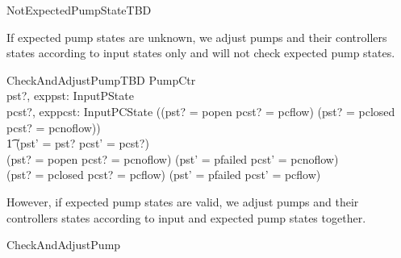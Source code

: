 \documentclass{report} %
\begin{document}
\begin{zed}
NotExpectedPumpStateTBD 
\end{zed}
If expected pump states are unknown, we adjust pumps and their controllers states according to input states only and will not check expected pump states.

\begin{schema}{CheckAndAdjustPumpTBD}
  \Delta PumpCtr \\ %
  pst?, exppst: InputPState \\ %
  pcst?, exppcst: InputPCState
  \where %
  ((pst? = popen \land pcst? = pcflow) \lor (pst? = pclosed \land pcst? = pcnoflow)) \\
  \t1  \implies (pst' = pst? \land pcst' = pcst?) \\
  (pst? = popen \land pcst? = pcnoflow) \implies (pst' = pfailed \land pcst' = pcnoflow) \\
  (pst? = pclosed \land pcst? = pcflow) \implies (pst' = pfailed \land pcst' = pcflow)
\end{schema}
However, if expected pump states are valid, we adjust pumps and their controllers states according to input and expected pump states together.
\begin{zed} CheckAndAdjustPump 
\end{zed}
\end{document}
